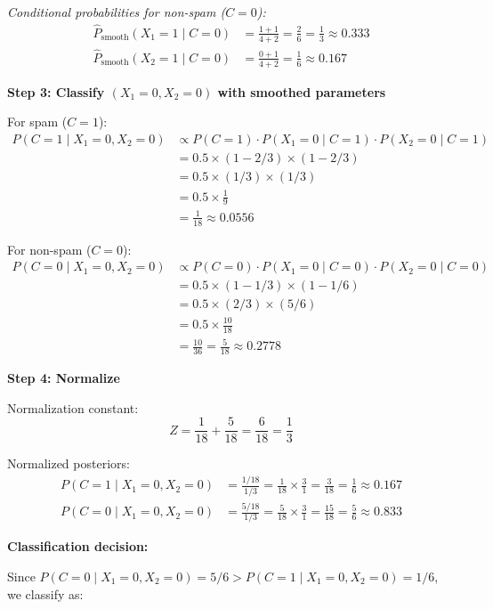 \documentclass[12pt]{article}
\begin{document}
\begin{solution}
\textit{Conditional probabilities for non-spam ($C = 0$):}
\begin{align}
\hat{P}_{\text{smooth}}(X_1 = 1 \mid C = 0) &= \frac{1 + 1}{4 + 2} = \frac{2}{6} = \frac{1}{3} \approx 0.333 \\
\hat{P}_{\text{smooth}}(X_2 = 1 \mid C = 0) &= \frac{0 + 1}{4 + 2} = \frac{1}{6} \approx 0.167
\end{align}

\textbf{Step 3: Classify $(X_1 = 0, X_2 = 0)$ with smoothed parameters}

For spam ($C = 1$):
\begin{align}
P(C = 1 \mid X_1 = 0, X_2 = 0) &\propto P(C = 1) \cdot P(X_1 = 0 \mid C = 1) \cdot P(X_2 = 0 \mid C = 1) \\
&= 0.5 \times (1 - 2/3) \times (1 - 2/3) \\
&= 0.5 \times (1/3) \times (1/3) \\
&= 0.5 \times \frac{1}{9} \\
&= \frac{1}{18} \approx 0.0556
\end{align}

For non-spam ($C = 0$):
\begin{align}
P(C = 0 \mid X_1 = 0, X_2 = 0) &\propto P(C = 0) \cdot P(X_1 = 0 \mid C = 0) \cdot P(X_2 = 0 \mid C = 0) \\
&= 0.5 \times (1 - 1/3) \times (1 - 1/6) \\
&= 0.5 \times (2/3) \times (5/6) \\
&= 0.5 \times \frac{10}{18} \\
&= \frac{10}{36} = \frac{5}{18} \approx 0.2778
\end{align}

\textbf{Step 4: Normalize}

Normalization constant:
\[
Z = \frac{1}{18} + \frac{5}{18} = \frac{6}{18} = \frac{1}{3}
\]

Normalized posteriors:
\begin{align}
P(C = 1 \mid X_1 = 0, X_2 = 0) &= \frac{1/18}{1/3} = \frac{1}{18} \times \frac{3}{1} = \frac{3}{18} = \frac{1}{6} \approx 0.167 \\
P(C = 0 \mid X_1 = 0, X_2 = 0) &= \frac{5/18}{1/3} = \frac{5}{18} \times \frac{3}{1} = \frac{15}{18} = \frac{5}{6} \approx 0.833
\end{align}

\textbf{Classification decision:}

Since $P(C = 0 \mid X_1 = 0, X_2 = 0) = 5/6 > P(C = 1 \mid X_1 = 0, X_2 = 0) = 1/6$, we classify as:


\end{solution}
\end{document}
